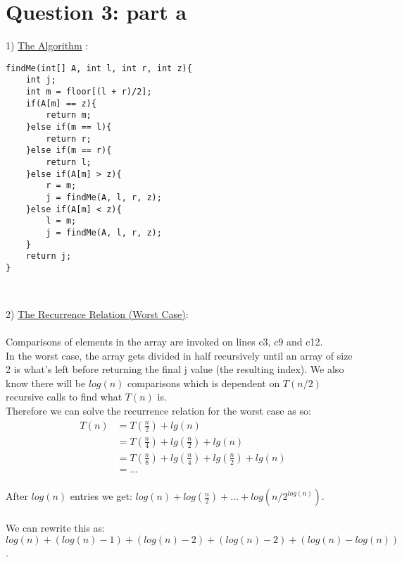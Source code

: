 \documentclass{article}
\begin{document}
\section{Question 3: part a}
1) \underline{The Algorithm} :
\begin{lstlisting}
findMe(int[] A, int l, int r, int z){
    int j;                              
    int m = floor[(l + r)/2];           
    if(A[m] == z){                      
        return m;                       
    }else if(m == l){                   
        return r;                       
    }else if(m == r){                   
        return l;                       
    }else if(A[m] > z){                 
        r = m;                          
        j = findMe(A, l, r, z);     
    }else if(A[m] < z){                 
        l = m;                          
        j = findMe(A, l, r, z);         
    }
    return j;                           
}



\end{lstlisting}
2) \underline{The Recurrence Relation (Worst Case)}:
\\
\\Comparisons of elements in the array are invoked on lines c3, c9 and c12.
\\In the worst case, the array gets divided in half recursively until an array of size 2 is what's left before
returning the final j value (the resulting index). We also know there will be $log(n)$ comparisons which is dependent on $T(n/2)$ recursive calls to find what $T(n)$ is.
\\Therefore we can solve the recurrence relation for the worst case as so:
\\
\begin{align}
    \nonumber T(n) &= T(\frac{n}{2}) + lg(n)\\
    \nonumber &= T(\frac{n}{4}) + lg(\frac{n}{2}) + lg(n)\\
    \nonumber &= T(\frac{n}{8}) + lg(\frac{n}{4}) + lg(\frac{n}{2}) +lg(n)\\
    \nonumber &= .  .  .
\end{align}
\\
After $log(n)$ entries we get: $log(n) + log(\frac{n}{2}) + ... + log(n/2^{log(n)})$.
\\
\\We can rewrite this as: 
\\$log(n) + (log(n) - 1) + (log(n) - 2) + (log(n) - 2) + (log(n) - log(n)) $.
\\
\end{document}
